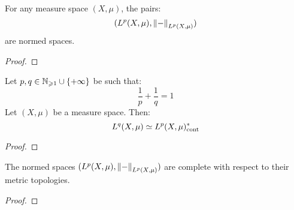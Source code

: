         \begin{lemma} \label{lemma: minkowski_inequality}
            For any measure space $(X, \mu)$, the pairs:
                $$(L^p(X, \mu), \left\| {-} \right\|_{L^p(X, \mu)})$$
            are normed spaces.
        \end{lemma}
            \begin{proof}
            \end{proof}
        \begin{theorem} \label{theorem: L_p_space_duality}
            Let $p, q \in \mathbb{N}_{\geqslant 1} \cup \{+\infty\}$ be such that:
                $$\frac1p + \frac1q = 1$$
            Let $(X, \mu)$ be a measure space. Then:
                $$L^q(X, \mu) \simeq L^p(X, \mu)^*_{\mathrm{cont}}$$
        \end{theorem}
            \begin{proof}
                
            \end{proof}
        \begin{theorem} \label{theorem: L_p_space_completeness}
            The normed spaces $(L^p(X, \mu), \left\| {-} \right\|_{L^p(X, \mu)})$ are complete with respect to their metric topologies.
        \end{theorem}
            \begin{proof}
            \end{proof}
